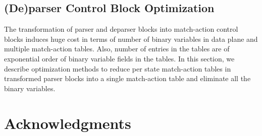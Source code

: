 \documentclass{hotnets19}
\begin{document}
\subsection{(De)parser Control Block Optimization}
The transformation of parser and deparser blocks into match-action control blocks induces huge cost in terms of number of binary variables in data plane and multiple match-action tables.
Also, number of entries in the tables are of exponential order of binary variable fields in the tables.
In this section, we describe optimization methods to reduce per state match-action tables in transformed parser blocks into a single match-action table and eliminate all the binary variables.

\section*{Acknowledgments}

 
\begin{small}

\end{small}
\end{document}
